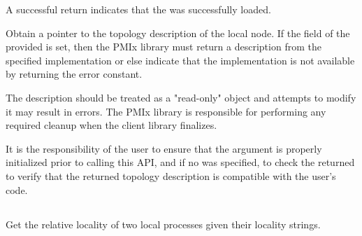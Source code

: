 A successful return indicates that the  was successfully loaded.

\returnsimple

\descr

Obtain a pointer to the topology description of the local node. If the
 field of the provided  is set, then
the \ac{PMIx} library must return a description from the specified
implementation or else indicate that the implementation is not available by
returning the  error constant.

The description should be treated as a "read-only" object and attempts to modify it may result in errors.
The \ac{PMIx} library is responsible for performing any required cleanup when the client library finalizes.

\adviceuserstart
It is the responsibility of the user to ensure that the  argument
is properly initialized prior to calling this \ac{API}, and if no  was specified, to check the
returned  to verify that the returned topology description is
compatible with the user's code.
\adviceuserend

\subsection{}

\summary

Get the relative locality of two local processes given their locality strings.

\format


\begin{arglist}
\end{arglist}

